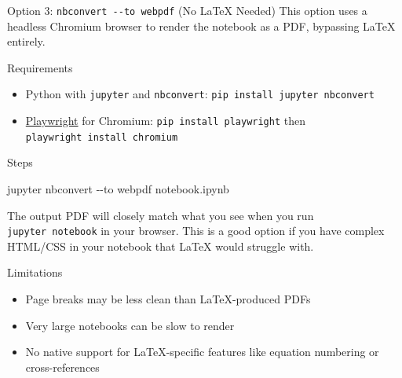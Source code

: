 \documentclass[
  ignorenonframetext,
  aspectratio=169,
]{beamer}
\newenvironment{Shaded}{\begin{snugshade}}{\end{snugshade}}
\newcommand{\AttributeTok}[1]{\textcolor[rgb]{0.40,0.45,0.13}{#1}}
\newcommand{\ExtensionTok}[1]{\textcolor[rgb]{0.00,0.23,0.31}{#1}}
\newcommand{\NormalTok}[1]{\textcolor[rgb]{0.00,0.23,0.31}{#1}}
\providecommand{\tightlist}{%
  \setlength{\itemsep}{0pt}\setlength{\parskip}{0pt}}
\begin{document}
\begin{frame}[fragile]{Option 3: \texttt{nbconvert\ -\/-to\ webpdf} (No
LaTeX Needed)}
\protect{}\label{option-3-nbconvert---to-webpdf-no-latex-needed}
This option uses a headless Chromium browser to render the notebook as a
PDF, bypassing LaTeX entirely.

\begin{block}{Requirements}
\protect{}\label{requirements-2}
\begin{itemize}
\tightlist
\item
  Python with \texttt{jupyter} and \texttt{nbconvert}:
  \texttt{pip\ install\ jupyter\ nbconvert}
\item
  \href{https://playwright.dev/}{Playwright} for Chromium:
  \texttt{pip\ install\ playwright} then
  \texttt{playwright\ install\ chromium}
\end{itemize}
\end{block}

\begin{block}{Steps}
\protect{}\label{steps-2}
\begin{Shaded}
\begin{Highlighting}[]
\ExtensionTok{jupyter}\NormalTok{ nbconvert }\AttributeTok{{-}{-}to}\NormalTok{ webpdf notebook.ipynb}
\end{Highlighting}
\end{Shaded}

The output PDF will closely match what you see when you run
\texttt{jupyter\ notebook} in your browser. This is a good option if you
have complex HTML/CSS in your notebook that LaTeX would struggle with.
\end{block}

\begin{block}{Limitations}
\protect{}\label{limitations}
\begin{itemize}
\tightlist
\item
  Page breaks may be less clean than LaTeX-produced PDFs
\item
  Very large notebooks can be slow to render
\item
  No native support for LaTeX-specific features like equation numbering
  or cross-references
\end{itemize}
\end{block}
\end{frame}
\end{document}
